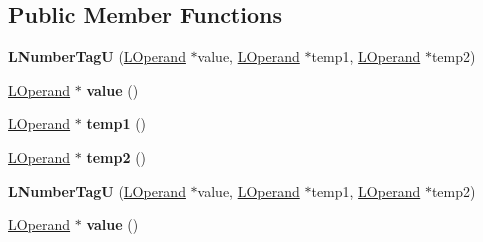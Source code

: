 \subsection*{Public Member Functions}
\begin{DoxyCompactItemize}
\item 
{\bfseries L\+Number\+TagU} (\hyperlink{classv8_1_1internal_1_1_l_operand}{L\+Operand} $\ast$value, \hyperlink{classv8_1_1internal_1_1_l_operand}{L\+Operand} $\ast$temp1, \hyperlink{classv8_1_1internal_1_1_l_operand}{L\+Operand} $\ast$temp2)\hypertarget{classv8_1_1internal_1_1_l_number_tag_u_a29c2cbf4352a712caccdaed62fc601d7}{}\label{classv8_1_1internal_1_1_l_number_tag_u_a29c2cbf4352a712caccdaed62fc601d7}

\item 
\hyperlink{classv8_1_1internal_1_1_l_operand}{L\+Operand} $\ast$ {\bfseries value} ()\hypertarget{classv8_1_1internal_1_1_l_number_tag_u_a250600d81f63976f70111c5b90a2a5c3}{}\label{classv8_1_1internal_1_1_l_number_tag_u_a250600d81f63976f70111c5b90a2a5c3}

\item 
\hyperlink{classv8_1_1internal_1_1_l_operand}{L\+Operand} $\ast$ {\bfseries temp1} ()\hypertarget{classv8_1_1internal_1_1_l_number_tag_u_af1b9a9050ae593071ec641d8db810594}{}\label{classv8_1_1internal_1_1_l_number_tag_u_af1b9a9050ae593071ec641d8db810594}

\item 
\hyperlink{classv8_1_1internal_1_1_l_operand}{L\+Operand} $\ast$ {\bfseries temp2} ()\hypertarget{classv8_1_1internal_1_1_l_number_tag_u_afac0fd287b623c724001aee50155b71c}{}\label{classv8_1_1internal_1_1_l_number_tag_u_afac0fd287b623c724001aee50155b71c}

\item 
{\bfseries L\+Number\+TagU} (\hyperlink{classv8_1_1internal_1_1_l_operand}{L\+Operand} $\ast$value, \hyperlink{classv8_1_1internal_1_1_l_operand}{L\+Operand} $\ast$temp1, \hyperlink{classv8_1_1internal_1_1_l_operand}{L\+Operand} $\ast$temp2)\hypertarget{classv8_1_1internal_1_1_l_number_tag_u_a29c2cbf4352a712caccdaed62fc601d7}{}\label{classv8_1_1internal_1_1_l_number_tag_u_a29c2cbf4352a712caccdaed62fc601d7}

\item 
\hyperlink{classv8_1_1internal_1_1_l_operand}{L\+Operand} $\ast$ {\bfseries value} ()\hypertarget{classv8_1_1internal_1_1_l_number_tag_u_a250600d81f63976f70111c5b90a2a5c3}{}\label{classv8_1_1internal_1_1_l_number_tag_u_a250600d81f63976f70111c5b90a2a5c3}


\end{DoxyCompactItemize}
